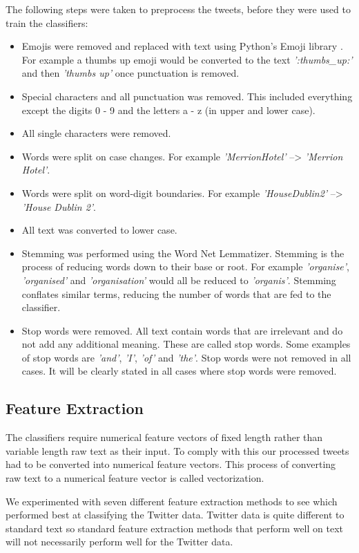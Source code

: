 The following steps were taken to preprocess the tweets, before they were used to train the classifiers:
\begin{itemize}
    \item Emojis were removed and replaced with text using Python's Emoji library \cite{emoji}. For example a thumbs up emoji would be converted to the text \emph{':thumbs\_up:'} and then \emph{'thumbs up'} once punctuation is removed.
    \item Special characters and all punctuation was removed. This included everything except the digits 0 - 9 and the letters a - z (in upper and lower case).
    \item All single characters were removed.
    \item Words were split on case changes. For example \emph{'MerrionHotel'} --> \emph{'Merrion Hotel'}.
    \item Words were split on word-digit boundaries. For example \emph{'HouseDublin2'} --> \emph{'House Dublin 2'}.
    \item All text was converted to lower case.
    \item Stemming was performed using the Word Net Lemmatizer. Stemming is the process of reducing words down to their base or root. For example \emph{'organise'}, \emph{'organised'} and \emph{'organisation'} would all be reduced to \emph{'organis'}. Stemming conflates similar terms, reducing the number of words that are fed to the classifier.
    \item Stop words were removed. All text contain words that are irrelevant and do not add any additional meaning. These are called stop words. Some examples of stop words are \emph{'and'}, \emph{'I'}, \emph{'of'} and \emph{'the'}. Stop words were not removed in all cases. It will be clearly stated in all cases where stop words were removed.
\end{itemize}

\subsection*{Feature Extraction}

The classifiers require numerical feature vectors of fixed length rather than variable length raw text as their input. To comply with this our processed tweets had to be converted into numerical feature vectors. This process of converting raw text to a numerical feature vector is called vectorization.

We experimented with seven different feature extraction methods to see which performed best at classifying the Twitter data. Twitter data is quite different to standard text so standard feature extraction methods that perform well on text will not necessarily perform well for the Twitter data.

